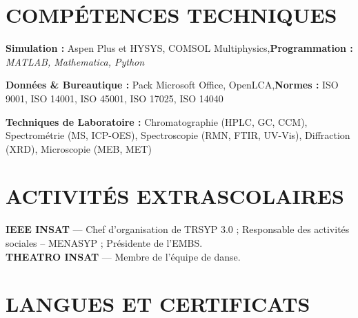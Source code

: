 \documentclass[10pt]{article}
\begin{document}
\section{COMPÉTENCES TECHNIQUES}
\begin{bul}
\item \textbf{Simulation :} Aspen Plus et HYSYS, COMSOL Multiphysics\sep\textbf{Programmation :} \textit{MATLAB, Mathematica, Python}
\item \textbf{Données \& Bureautique :} Pack Microsoft Office, OpenLCA\sep\textbf{Normes :} ISO 9001, ISO 14001, ISO 45001, ISO 17025, ISO 14040
\item \textbf{Techniques de Laboratoire :} Chromatographie (HPLC, GC, CCM), Spectrométrie (MS, ICP-OES), Spectroscopie (RMN, FTIR, UV-Vis), Diffraction (XRD), Microscopie (MEB, MET)
\end{bul}

\section{ACTIVITÉS EXTRASCOLAIRES}
\textbf{IEEE INSAT} — Chef d'organisation de TRSYP 3.0 ; Responsable des activités sociales – MENASYP ; Présidente de l'EMBS.\\
\textbf{THEATRO INSAT} — Membre de l'équipe de danse.\par

\section{LANGUES ET CERTIFICATS}
\end{document}
